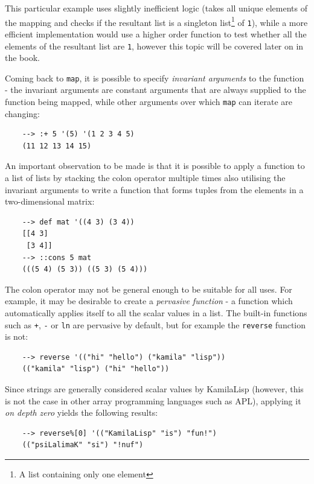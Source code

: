 This particular example uses slightly inefficient logic (takes all unique elements of the mapping and checks if the resultant list is a singleton list\footnote{A list containing only one element} of \verb|1|), while a more efficient implementation would use a higher order function to test whether all the elements of the resultant list are \verb|1|, however this topic will be covered later on in the book.

Coming back to \verb|map|, it is possible to specify \textit{invariant arguments} to the function - the invariant arguments are constant arguments that are always supplied to the function being mapped, while other arguments over which \verb|map| can iterate are changing:

\begin{Verbatim}
    --> :+ 5 '(5) '(1 2 3 4 5)
    (11 12 13 14 15)
\end{Verbatim}

An important observation to be made is that it is possible to apply a function to a list of lists by stacking the colon operator multiple times also utilising the invariant arguments to write a function that forms tuples from the elements in a two-dimensional matrix:

\begin{Verbatim}
    --> def mat '((4 3) (3 4))
    [[4 3]
     [3 4]]
    --> ::cons 5 mat
    (((5 4) (5 3)) ((5 3) (5 4)))
\end{Verbatim}

The colon operator may not be general enough to be suitable for all uses. For example, it may be desirable to create a \textit{pervasive function} - a function which automatically applies itself to all the scalar values in a list. The built-in functions such as \verb|+|, \verb|-| or \verb|ln| are pervasive by default, but for example the \verb|reverse| function is not:

\begin{Verbatim}
    --> reverse '(("hi" "hello") ("kamila" "lisp"))
    (("kamila" "lisp") ("hi" "hello"))
\end{Verbatim}

Since strings are generally considered scalar values by KamilaLisp (however, this is not the case in other array programming languages such as APL), applying it \textit{on depth zero} yields the following results:

\begin{Verbatim}
    --> reverse%[0] '(("KamilaLisp" "is") "fun!")
    (("psiLalimaK" "si") "!nuf")
\end{Verbatim}

